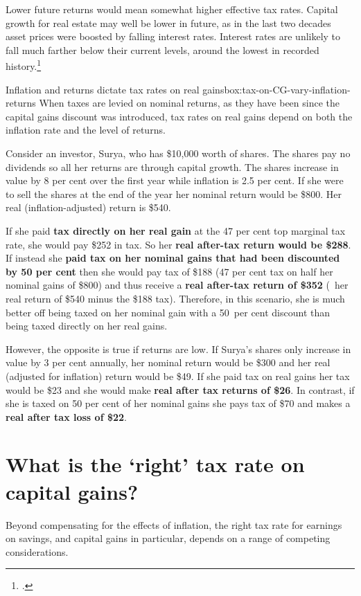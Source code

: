 Lower future returns would mean somewhat higher effective tax rates. Capital growth for real estate may well be lower in future, as in the last two decades asset prices were boosted by falling interest rates. Interest rates are unlikely to fall much farther below their current levels, around the lowest in recorded history.\footcite[][19]{Haldane2015}

\begin{verysmallbox}[!t]{Inflation and returns dictate tax rates on real gains}{box:tax-on-CG-vary-inflation-returns}
When taxes are levied on nominal returns, as they have been since the capital gains discount was introduced, tax rates on real gains depend on both the inflation rate and the level of returns. 

Consider an investor, Surya, who has \$10,000 worth of shares. The shares pay no dividends so all her returns are through capital growth. The shares increase in value by 8 per cent over the first year while inflation is 2.5 per cent. If she were to sell the shares at the end of the year her nominal return would be \$800. Her real (inflation-adjusted) return is \$540. 

If she paid \textbf{tax directly on her real gain} at the 47 per cent top marginal tax rate, she would pay \$252 in tax. So her \textbf{real after-tax return would be \$288}. If instead she \textbf{paid tax on her nominal gains that had been discounted by 50 per cent} then she would pay tax of \$188 (47 per cent tax on half her nominal gains of \$800) and thus receive a \textbf{real after-tax return of \$352} (\ie~her real return of \$540 minus the \$188 tax). Therefore, in this scenario, she is much better off being taxed on her nominal gain with a 50~per cent discount than being taxed directly on her real gains. 

However, the opposite is true if returns are low. If Surya’s shares only increase in value by 3 per cent annually, her nominal return would be \$300 and her real (adjusted for inflation) return would be \$49. If she paid tax on real gains her tax would be \$23 and she would make \textbf{real after tax returns of \$26}. In contrast, if she is taxed on 50 per cent of her nominal gains she pays tax of \$70 and makes a \textbf{real after tax loss of \$22}.
\end{verysmallbox}



\section{What is the `right' tax rate on capital gains?}\label{sec:What-is-the-right-tax-rate-on-capital-gains}
Beyond compensating for the effects of inflation, the right tax rate for earnings on savings, and capital gains in particular, depends on a range of competing considerations. 

